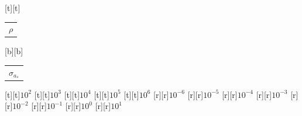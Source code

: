 %    
%
%
\begin{psfrags}%
\psfragscanon%
%
[t][t]{\color[rgb]{0,0,0}\setlength{\tabcolsep}{0pt}\begin{tabular}{c}{\Large$\rho$}\end{tabular}}%
[b][b]{\color[rgb]{0,0,0}\setlength{\tabcolsep}{0pt}\begin{tabular}{c}{\Large$\sigma_{a_\ast}$}\end{tabular}}%
%
[t][t]{$10^{2}$}%
[t][t]{$10^{3}$}%
[t][t]{$10^{4}$}%
[t][t]{$10^{5}$}%
[t][t]{$10^{6}$}%
%
[r][r]{$10^{-6}$}%
[r][r]{$10^{-5}$}%
[r][r]{$10^{-4}$}%
[r][r]{$10^{-3}$}%
[r][r]{$10^{-2}$}%
[r][r]{$10^{-1}$}%
[r][r]{$10^{0}$}%
[r][r]{$10^{1}$}%
%
%
\end{psfrags}%
%
